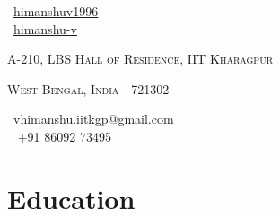 \documentclass[a4paper,10pt]{extarticle} %
\begin{document}
\begin{enumerate}
\begin{minipage}{0.2\linewidth}
 \normalsize \faGithub\ {\href{https://github.com/himanshuv1996}{himanshuv1996}}\\
 \normalsize  \faLinkedinSquare\ {\href{https://www.linkedin.com/in/himanshu-v}{himanshu-v}}
 \end{minipage}
 \begin{minipage}{0.5\linewidth}
  \normalsize\par{\par} %
 \par{\centering\normalsize {\textsc{A-210, LBS Hall of Residence, IIT Kharagpur}}\hfill\par}
  \par{\centering\normalsize {\textsc{West Bengal, India - 721302}}\hfill\par}
 \end{minipage}
 \begin{minipage}{0.3\linewidth}
\normalsize \faEnvelope\ {\href{mailto:vhimanshu.iitkgp@gmail.com}{vhimanshu.iitkgp@gmail.com}}\\
\normalsize \faPhone\ {  +91 86092 73495}
\end{minipage}
 \end{enumerate}




\section{\large{Education}}
\end{document}
